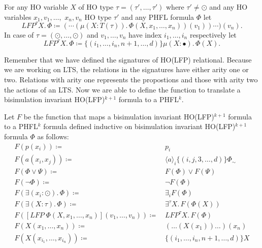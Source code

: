 \begin{definition}
    For any HO variable $X$ of HO type $\tau = (\tau', \dots, \tau')$ where $\tau' \neq \odot$ and any HO variables
    $x_1, v_1, \dots, $ $x_n, v_n$ HO type $\tau'$ and any PHFL formula $\Phi$ let
    \[LFP^\tau X.\,\Phi \coloneqq (\dotsb (\mu (X \colon T(\tau)).\,\Phi(X, x_1, \dots, x_n))(v_1))\dotsb)(v_n).\]
    In case of $\tau = (\odot, \dots, \odot)$ and $v_1, \dots, v_n$ have index $i_1, \dots, i_n$ respectively let
    \[LFP^{\tau} X.\,\Phi \coloneqq \{(i_1, \dots, i_n, n + 1, \dots, d)\} \mu (X \colon \bullet).\,\Phi(X).\]
\end{definition}

Remember that we have defined the signatures of HO(LFP) relational. Because we are working on LTS, the relations in
the signatures have either arity one or two. Relations with arity one represents the propostions and those with arity
two the actions of an LTS. Now we are able to define the function to translate a bisimulation invariant HO(LFP)$^{k+1}$
formula to a PHFL$^k$.

\begin{definition}
    \label{definition:lower_bounds_phfl_formula_function}
    Let $F$ be the function that maps a bisimulation invariant HO(LFP)$^{k+1}$ formula to a PHFL$^k$ formula defined
    inductive on bisimulation invariant HO(LFP)$^{k+1}$ formula $\Phi$ as follows:
    \begin{align*}
        F(p(x_i)) \coloneqq &\, p_i \\
        F(a(x_i, x_j)) \coloneqq &\, \langle a \rangle_i \{(i, j, 3, \dots, d)\} \Phi_\sim \\
        F(\Phi \vee \Psi) \coloneqq &\, F(\Phi) \vee F(\Psi) \\
        F(\neg \Phi) \coloneqq &\, \neg F(\Phi) \\
        F(\exists (x_i \colon \odot).\,\Phi) \coloneqq &\, \exists_i F(\Phi) \\
        F(\exists (X \colon \tau).\,\Phi) \coloneqq &\, \exists^\tau X.\,F(\Phi(X)) \\
        F([LFP\;\Phi(X, x_1, \dots, x_n)](v_1, \dots, v_n)) \coloneqq &\,LFP^\tau X.\, F(\Phi) \\
        F(X(x_1, \dots, x_n)) \coloneqq &\, (\dots (X(x_1))\dots)(x_n)\\
        F(X(x_{i_1}, \dots, x_{i_n})) \coloneqq &\, \{(i_1, \dots, i_n, n + 1, \dots, d)\}X
    \end{align*}
\end{definition}

